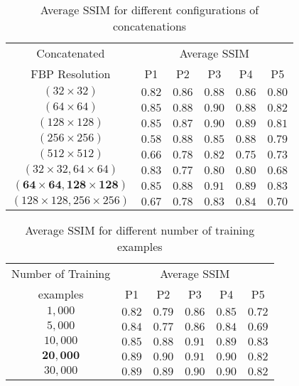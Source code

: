 \begin{table}[ht!]
	\centering
	\caption{Average \ac{SSIM} for different configurations of concatenations}
	\label{table:5}
	\begin{tabular}{||c|c|c|c|c|c||} 
		\hline
		Concatenated & \multicolumn{5}{c||}{Average \ac{SSIM}}  \\ \cline{2-6}%
		\ac{FBP} Resolution &   P1  &  P2     & P3 & P4 & P5 \\
		\hline\hline
		$(32\times32)$ & $0.82$ & $0.86$ & $0.88$ & $0.86$ & $0.80$ \\ 
		$(64\times64)$ & $0.85$ & $0.88$ & $0.90$ & $0.88$ & $0.82$ \\   
		$(128\times128)$ & $0.85$ & $0.87$ & $0.90$ & $0.89$ & $0.81$ \\   
		$(256\times256)$ & $0.58$ & $0.88$ & $0.85$ & $0.88$ & $0.79$ \\   
		$(512\times512)$ & $0.66$ & $0.78$ & $0.82$ & $0.75$ & $0.73$ \\   
		\hline
		$(32\times32,64\times64)$ & $0.83$ & $0.77$ & $0.80$ & $0.80$ & $0.68$ \\   
		$\mathbf{(64\times64,128\times128)}$ & $\mathbf{0.85}$ & $\mathbf{0.88}$ & $\mathbf{0.91}$ & $\mathbf{0.89}$ & $\mathbf{0.83}$ \\   
		$(128\times128,256\times256)$ & $0.67$ & $0.78$ & $0.83$ & $0.84$ & $0.70$ \\   
		\hline  
		
		\hline  
	\end{tabular}
	
\end{table}

\begin{table}[ht!]
	\centering
	\caption{Average \ac{SSIM} for different number of training examples}
	\label{table:6}
	\begin{tabular}{||c|c|c|c|c|c||} 
		\hline
		Number of Training  & \multicolumn{5}{c||}{Average \ac{SSIM}}  \\ \cline{2-6}%
		examples &   P1  &  P2     & P3 & P4 & P5 \\
		\hline\hline
		$1,000$ & $0.82$ & $0.79$ & $0.86$ & $0.85$ & $0.72$ \\ 
		$5,000$ & $0.84$ & $0.77$ & $0.86$ & $0.84$ & $0.69$ \\   
		$10,000$ & $0.85$ & $0.88$ & $0.91$ & $0.89$ & $0.83$ \\   
		$\mathbf{20,000}$ & $\mathbf{0.89}$ & $\mathbf{0.90}$ & $\mathbf{0.91}$ & $\mathbf{0.90}$ & $\mathbf{0.82}$ \\   
		$30,000$ & $0.89$ & $0.89$ & $0.90$ & $0.90$ & $0.82$ \\   
		\hline  
		
		\hline  
	\end{tabular}
	\vspace{.5cm}
\end{table}



